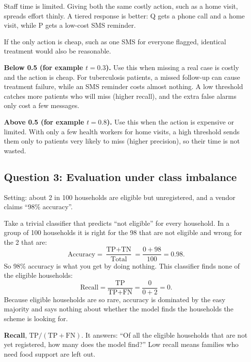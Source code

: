 Staff time is limited. Giving both the same costly action, such as a home visit, spreads effort
thinly. A tiered response is better: Q gets a phone call and a home visit, while P gets a
low-cost SMS reminder.

If the only action is cheap, such as one SMS for everyone flagged, identical treatment would
also be reasonable.

\textbf{Below 0.5 (for example $t = 0.3$).} Use this when missing a real case is costly and the
action is cheap. For tuberculosis patients, a missed follow-up can cause treatment failure, while
an SMS reminder costs almost nothing. A low threshold catches more patients who will miss
(higher recall), and the extra false alarms only cost a few messages.

\textbf{Above 0.5 (for example $t = 0.8$).} Use this when the action is expensive or limited.
With only a few health workers for home visits, a high threshold sends them only to patients
very likely to miss (higher precision), so their time is not wasted.

\subsection{Question 3: Evaluation under class imbalance}
Setting: about 2 in 100 households are eligible but unregistered, and a vendor claims ``98\% accuracy''.

Take a trivial classifier that predicts ``not eligible'' for every household. In a group of
100 households it is right for the 98 that are not eligible and wrong for the 2 that are:
\[
  \text{Accuracy} = \frac{\text{TP}+\text{TN}}{\text{Total}} = \frac{0 + 98}{100} = 0.98.
\]
So 98\% accuracy is what you get by doing nothing. This classifier finds none of the
eligible households:
\[
  \text{Recall} = \frac{\text{TP}}{\text{TP}+\text{FN}} = \frac{0}{0+2} = 0.
\]
Because eligible households are so rare, accuracy is dominated by the easy majority and says
nothing about whether the model finds the households the scheme is looking for.

\textbf{Recall}, $\text{TP}/(\text{TP}+\text{FN})$. It answers: ``Of all the eligible
households that are not yet registered, how many does the model find?'' Low recall means
families who need food support are left out.

